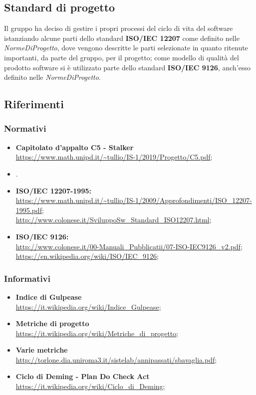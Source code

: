 \subsection{Standard di progetto}
Il gruppo \Gruppo{} ha deciso di gestire i propri processi del ciclo di vita del software istanziando alcune parti dello standard \textbf{ISO/IEC 12207} come definito nelle \textit{NormeDiProgetto}, dove vengono descritte le parti selezionate in quanto ritenute importanti, da parte del gruppo, per il progetto; 
come modello di qualità del prodotto software si è utilizzato parte dello standard \textbf{ISO/IEC 9126}, anch'esso definito nelle \textit{NormeDiProgetto}.

\subsection{Riferimenti}

\subsubsection{Normativi}
\begin{itemize}
    \item \textbf{Capitolato d'appalto C5 - Stalker}\\     
    \url{https://www.math.unipd.it/~tullio/IS-1/2019/Progetto/C5.pdf};
    \item {}.
    \item \textbf{ISO/IEC 12207-1995:}\\     
    \url{https://www.math.unipd.it/~tullio/IS-1/2009/Approfondimenti/ISO_12207-1995.pdf};\\
    \url{http://www.colonese.it/SviluppoSw_Standard_ISO12207.html};
    \item \textbf{ISO/IEC 9126:}\\
    \url{http://www.colonese.it/00-Manuali_Pubblicatii/07-ISO-IEC9126_v2.pdf};\\
    \url{https://en.wikipedia.org/wiki/ISO/IEC_9126};
\end{itemize}

\subsubsection{Informativi}
\begin{itemize}
    \item \textbf{Indice di Gulpease}\\
    \url{https://it.wikipedia.org/wiki/Indice_Gulpease};
    \item \textbf{Metriche di progetto}\\
    \url{https://it.wikipedia.org/wiki/Metriche_di_progetto};
    \item \textbf{Varie metriche}\\
    \url{http://torlone.dia.uniroma3.it/sistelab/annipassati/sbavaglia.pdf};
    \item \textbf{Ciclo di Deming - Plan Do Check Act}\\
    \url{https://it.wikipedia.org/wiki/Ciclo_di_Deming};
    
\end{itemize}
